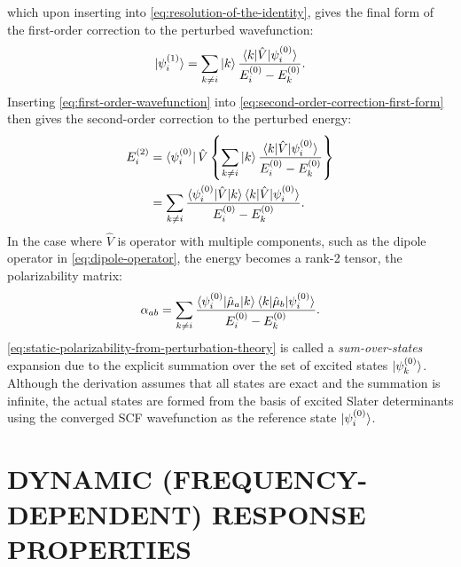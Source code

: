 \documentclass[%
class = book,%
crop = false,%
float = true,%
multi = true,%
preview = false,%
]{standalone}
\newcommand{\caps}[1]{\uppercase{#1}}
\begin{document}
which upon inserting into \eqref{eq:resolution-of-the-identity}, gives the final form of the first-order correction to the perturbed wavefunction:
\begin{equation}
  \label{eq:first-order-wavefunction}
  \ket{\psi_{i}^{(1)}} = \sum_{k\neq i} \ket{k} \frac{\braket{k|\hat{V}|\psi_{i}^{(0)}}}{E_{i}^{(0)} - E_{k}^{(0)}}.
\end{equation}
Inserting \eqref{eq:first-order-wavefunction} into \eqref{eq:second-order-correction-first-form} then gives the second-order correction to the perturbed energy:
\begin{equation}
  \label{eq:second-order-energy}
  \begin{aligned}
    E_{i}^{(2)} &= \bra{\psi_{i}^{(0)}} \hat{V} \left\{ \sum_{k\neq i} \ket{k} \frac{\braket{k|\hat{V}|\psi_{i}^{(0)}}}{E_{i}^{(0)} - E_{k}^{(0)}} \right\} \\
    &= \sum_{k \neq i} \frac{\braket{\psi_{i}^{(0)}|\hat{V}|k}\braket{k|\hat{V}|\psi_{i}^{(0)}}}{E_{i}^{(0)} - E_{k}^{(0)}}.
  \end{aligned}
\end{equation}
In the case where \(\hat{V}\) is operator with multiple components, such as the dipole operator in \eqref{eq:dipole-operator}, the energy becomes a rank-2 tensor, the polarizability matrix:
\begin{equation}
  \label{eq:static-polarizability-from-perturbation-theory}
  \alpha_{ab}= \sum_{k \neq i} \frac{\braket{\psi_{i}^{(0)}|\hat{\mu}_{a}|k}\braket{k|\hat{\mu}_{b}|\psi_{i}^{(0)}}}{E_{i}^{(0)} - E_{k}^{(0)}}.
\end{equation} %
\eqref{eq:static-polarizability-from-perturbation-theory} is called a \emph{sum-over-states} expansion due to the explicit summation over the set of excited states \(\ket{\psi_{k}^{(0)}}\). Although the derivation assumes that all states are exact and the summation is infinite, the actual states are formed from the basis of excited Slater determinants using the converged SCF wavefunction as the reference state \(\ket{\psi_{i}^{(0)}}\).

\section{\texorpdfstring{\caps{Dynamic (frequency-dependent) response properties}}{Static (time-independent) response properties}}
\label{sec:dynamic-properties}
\end{document}
